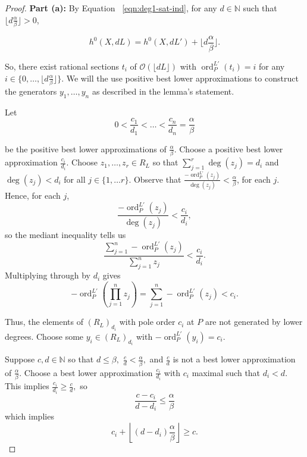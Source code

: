 \documentclass{amsart}
\theoremstyle{plain}
\theoremstyle{definition}
\theoremstyle{remark}
\numberwithin{equation}{section}
\newcommand\BN{{\mathbb N}}
\newcommand\sco{{\mathscr O}}
\DeclareMathOperator{\ord}{ord}
\newcommand{\halfcan}{L}
\begin{document}
\begin{proof}
{\bf Part (a):}
By
Equation ~\ref{eqn:deg1-sat-ind}, for any $d
\in \BN$ such that $\lfloor d \frac{ \alpha}{\beta} \rfloor > 0$,

\[
	h^0 (X, d \halfcan ) = h^0(X, d\halfcan') + \lfloor d\frac{\alpha}{\beta}\rfloor.
\]

\noindent
So,  there exist rational sections $t_i$ of $\sco(\lfloor d\halfcan \rfloor)$ with $\ord_P^{L'}(t_i) = i$
for any $i \in \{0, \ldots, \lfloor d \frac{\alpha}{
\beta} \rfloor \}$. We will the use positive best lower approximations to
construct the generators $y_1, \ldots, y_n$ as described in the lemma's statement.

Let 
\[
	0 < \frac{c_1}{d_1} < \ldots < \frac{c_n}{d_n} = \frac{\alpha}{
	\beta}
\]

\noindent
be the positive best lower approximations of $\frac{
\alpha}{\beta}$. 
Choose a positive best lower approximation $\frac{c_i}{d_i}$.  Choose $z_1, \ldots, z_r \in R_\halfcan$ so that $\sum_{j=1}^r \deg(z_j) = d_i$ and $\deg(z_j)<d_i$ for all $j\in \{1, \ldots r\}$. Observe that $\frac{-\ord_P^{\halfcan'}(z_j)}{\deg(z_j)}< \frac{\alpha}{\beta}$, for each $j$.  Hence, for each $j$, 
\[
	\frac{-\ord_P^{\halfcan'}(z_j)}{\deg(z_j)} < \frac{c_i}{d_i},
\]
so the mediant inequality tells us
\[
	\frac{\sum_{j=1}^n -\ord^{\halfcan'}_P(z_j)}{\sum_{j=1}^n z_j } < \frac{c_i}{d_i}.
\]
Multiplying through by $d_i$ gives
\[
	-\ord^{\halfcan'}_P \left(\prod_{j=1}^n z_j \right) = \sum_{j=1}^n -\ord^{\halfcan'}_P(z_j) < c_i .
\]

\noindent
Thus, the elements of $(R_{\halfcan})_{d_i}$ with pole order $c_i$ at $P$ are not generated by 
lower degrees. 
Choose some $y_i \in(R_{
\halfcan})_{d_i}$ with $-\ord_{P}^{L'}(y_i)=c_i$.

Suppose $c,d \in \BN$ so that $d\le \beta,$  $\frac{c}{d} < \frac{\alpha}{
\beta},$ and $\frac{c}{d}$ is not a best lower approximation of $\frac{\alpha}{\beta}$. Choose a
best lower approximation $\frac{c_i}{d_i}$ with $c_i$ maximal such that $d_i< d$.  This implies $\frac{c_i}{d_i}\ge \frac{c}{d},$ so 
\[
	\frac{c-c_i}{d-d_i}\le \frac{\alpha}{\beta}
\]
which implies
\begin{equation}\label{eqn:c-from-lower-terms}
	c_i +\left\lfloor (d-d_i) \frac{\alpha}{\beta} \right\rfloor \ge c.
\end{equation}


\end{proof}
\end{document}
